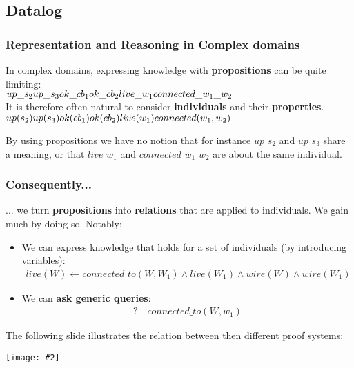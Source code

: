 \documentclass{article}
\def\blu#1{{\color{blu}#1}}
\def\gre#1{{\color{gre}#1}}
\newcommand{\centerfig}[2]{\begin{center}\texttt{[image: \#2]}\end{center}}
\begin{document}
\subsection*{Datalog}
\subsubsection*{Representation and Reasoning in Complex domains}
\begin{multicols}{2}
\noindent In complex domains, expressing knowledge with \textbf{propositions} can be quite limiting:\\
\begin{math}
up\_s_2\\
up\_s_3\\
ok\_cb_1\\
ok\_cb_2\\
live\_w_1\\
connected\_w_1\_w_2
\end{math}\\
\noindent It is therefore often natural to consider \textbf{individuals} and their \textbf{properties}.\\
\begin{math}
up(s_2)\\
up(s_3)\\
ok(cb_1)\\
ok(cb_2)\\
live(w_1)\\
connected(w_1, w_2)\\\\
\end{math}
\end{multicols}
By using propositions we have no notion that for instance $ up\_s_2 $ and $ up\_s_3 $ share a meaning, or that $ live\_w_1 $ and $ connected\_w_1\_w_2 $ are about the same individual. 
\subsubsection*{Consequently...}
... we turn \textbf{\color{Fuchsia}propositions} into \textbf{\gre{relations}} that are applied to individuals. We gain much by doing so. Notably:
\begin{itemize}
	\item We can express knowledge that holds for a set of individuals (by introducing \blu{variables}):
	\begin{align*}
	live(W) \leftarrow connected\_to(W, W_1) \land live(W_1) \land wire(W) \land wire(W_1)
	\end{align*}
	\item We can \textbf{ask generic queries}:
	\begin{align*}
	? \quad connected\_to(W, w_1)
	\end{align*}
\end{itemize}
The following slide illustrates the relation between then different proof systems:
\centerfig{0.8}{proof-sys-1}
\end{document}
